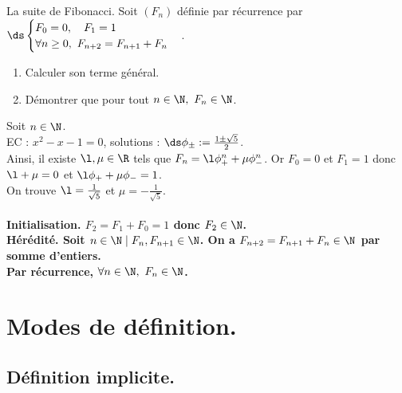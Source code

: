 \documentclass[11pt]{article}
\begin{document}
\begin{ex}{La suite de Fibonacci.}{}
    Soit $(F_n)$ définie par récurrence par $\ds \begin{cases}F_0 = 0, \quad F_1=1\\ \forall n \geq 0, ~ F_{n+2}=F_{n+1} + F_n\end{cases}$.
    \begin{enumerate}
        \item Calculer son terme général.
        \item Démontrer que pour tout $n\in\N, ~ F_n\in\N$.
    \end{enumerate}
    \tcblower
    Soit $n\in\N$.\\
     EC : $x^2-x-1=0$, solutions : $\ds\phi_\pm:=\frac{1\pm\sqrt{5}}{2}$.\\
    Ainsi, il existe $\l,\mu\in\R$  tels que $F_n=\l\phi_+^n + \mu\phi_-^n$. Or $F_0=0$ et $F_1=1$ donc $\l+\mu=0$ et $\l\phi_++\mu\phi_-=1$.\\
    On trouve $\l=\frac{1}{\sqrt{5}}$ et $\mu=-\frac{1}{\sqrt{5}}$.\\
     \\
    \bf{Initialisation.} $F_{2}=F_1+F_0=1$ donc $F_2\in\N$.\\
    \bf{Hérédité.} Soit $n\in\N \mid F_{n},F_{n+1}\in\N$. On a $F_{n+2}=F_{n+1}+F_n\in\N$ par somme d'entiers.\\
    Par récurrence, $\forall n\in\N, ~ F_n\in\N$.
\end{ex}

\section{Modes de définition.}

\subsection{Définition implicite.}
\end{document}
